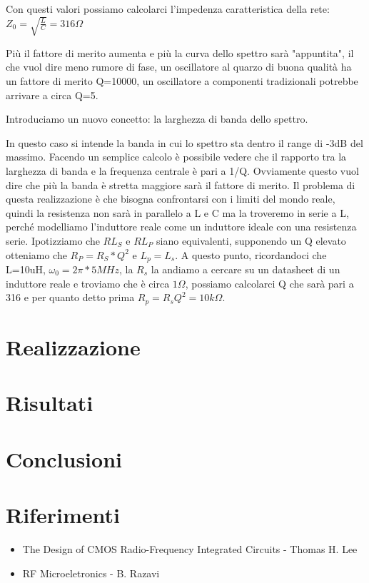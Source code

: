 \documentclass{article}
\begin{document}
Con questi valori possiamo calcolarci l'impedenza caratteristica della rete:
$Z_0=\sqrt{\frac{L}{C}}=316\Omega$
\centering

Più il fattore di merito aumenta e più la curva dello spettro sarà "appuntita", il che vuol dire meno rumore di fase, un oscillatore al quarzo di buona qualità ha un fattore di merito Q=10000, un oscillatore a componenti tradizionali potrebbe arrivare a circa Q=5.

Introduciamo un nuovo concetto: la larghezza di banda dello spettro.

In questo caso si intende la banda in cui lo spettro sta dentro il range di -3dB del massimo.
Facendo un semplice calcolo è possibile vedere che il rapporto tra la larghezza di banda e la frequenza centrale è pari a 1/Q.
Ovviamente questo vuol dire che più la banda è stretta maggiore sarà il fattore di merito.
Il problema di questa realizzazione è che bisogna confrontarsi con i limiti del mondo reale, quindi la resistenza non sarà in parallelo a L e C ma la troveremo in serie a L, perché modelliamo l'induttore reale come un induttore ideale con una resistenza serie.
Ipotizziamo che $RL_S$ e $RL_P$ siano equivalenti, supponendo un Q elevato otteniamo che $R_P=R_S*Q^2$  e $L_p=L_s$.
A questo punto, ricordandoci che L=10uH, $\omega_0=2\pi * 5MHz$, la $R_s$ la andiamo a cercare su un datasheet di un induttore reale e troviamo che è circa $1\Omega$, possiamo calcolarci Q che sarà pari a 316 e per quanto detto prima $R_p=R_sQ^2=10k\Omega$.

\newpage
\section{Realizzazione}

\newpage
\section{Risultati}

\newpage

\section{Conclusioni}

\newpage
\section{Riferimenti}

\begin{itemize}
\item The Design of CMOS Radio-Frequency Integrated Circuits - Thomas H. Lee
\item RF Microeletronics - B. Razavi
\end{itemize}
\end{document}
